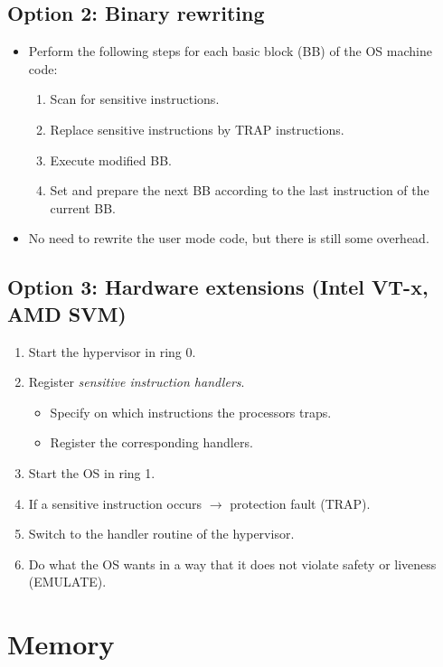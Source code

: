 		\subsection{Option 2: Binary rewriting}
			\begin{itemize}
				\item Perform the following steps for each basic block (BB) of the OS machine code:
					\begin{enumerate}
						\item Scan for sensitive instructions.
						\item Replace sensitive instructions by TRAP instructions.
						\item Execute modified BB.
						\item Set and prepare the next BB according to the last instruction of the current BB.
					\end{enumerate}
				\item No need to rewrite the user mode code, but there is still some overhead.
			\end{itemize}

		\subsection{Option 3: Hardware extensions (Intel VT-x, AMD SVM)}
			\begin{enumerate}
				\item Start the hypervisor in ring 0.
				\item Register \textit{sensitive instruction handlers}.
					\begin{itemize}
						\item Specify on which instructions the processors traps.
						\item Register the corresponding handlers.
					\end{itemize}
				\item Start the OS in ring 1.
				\item If a sensitive instruction occurs \(\rightarrow\) protection fault (TRAP).
				\item Switch to the handler routine of the hypervisor.
				\item Do what the OS wants in a way that it does not violate safety or liveness (EMULATE).
			\end{enumerate}

	\section{Memory}
